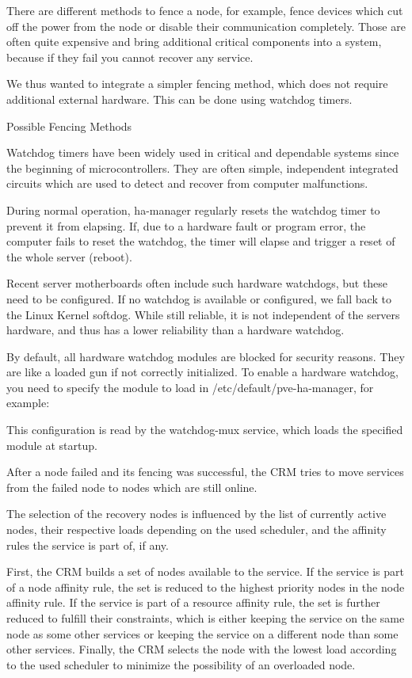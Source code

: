 There are different methods to fence a node, for example, fence devices which cut off the power from the node or disable their communication completely. Those are often quite expensive and bring additional critical components into a system, because if they fail you cannot recover any service.

We thus wanted to integrate a simpler fencing method, which does not require additional external hardware. This can be done using watchdog timers.

Possible Fencing Methods

Watchdog timers have been widely used in critical and dependable systems since the beginning of microcontrollers. They are often simple, independent integrated circuits which are used to detect and recover from computer malfunctions.

During normal operation, ha-manager regularly resets the watchdog timer to prevent it from elapsing. If, due to a hardware fault or program error, the computer fails to reset the watchdog, the timer will elapse and trigger a reset of the whole server (reboot).

Recent server motherboards often include such hardware watchdogs, but these need to be configured. If no watchdog is available or configured, we fall back to the Linux Kernel softdog. While still reliable, it is not independent of the servers hardware, and thus has a lower reliability than a hardware watchdog.

By default, all hardware watchdog modules are blocked for security reasons. They are like a loaded gun if not correctly initialized. To enable a hardware watchdog, you need to specify the module to load in /etc/default/pve-ha-manager, for example:

This configuration is read by the watchdog-mux service, which loads the specified module at startup.

After a node failed and its fencing was successful, the CRM tries to move services from the failed node to nodes which are still online.

The selection of the recovery nodes is influenced by the list of currently active nodes, their respective loads depending on the used scheduler, and the affinity rules the service is part of, if any.

First, the CRM builds a set of nodes available to the service. If the service is part of a node affinity rule, the set is reduced to the highest priority nodes in the node affinity rule. If the service is part of a resource affinity rule, the set is further reduced to fulfill their constraints, which is either keeping the service on the same node as some other services or keeping the service on a different node than some other services. Finally, the CRM selects the node with the lowest load according to the used scheduler to minimize the possibility of an overloaded node.


